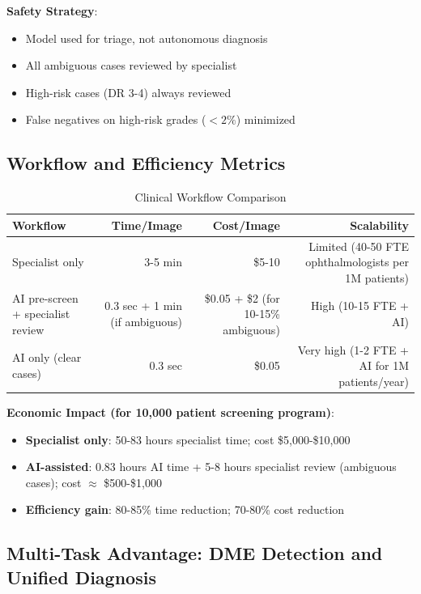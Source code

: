 \documentclass[12pt,a4paper]{article}
\begin{document}
\textbf{Safety Strategy}:

\begin{itemize}
    \item Model used for triage, not autonomous diagnosis
    \item All ambiguous cases reviewed by specialist
    \item High-risk cases (DR 3-4) always reviewed
    \item False negatives on high-risk grades ($< 2\%$) minimized
\end{itemize}

\subsection{Workflow and Efficiency Metrics}

\begin{table}[H]
\centering
\small
\caption{Clinical Workflow Comparison}
\begin{tabular}{|l|r|r|r|}
\hline
\textbf{Workflow} & \textbf{Time/Image} & \textbf{Cost/Image} & \textbf{Scalability} \\
\hline
Specialist only & 3-5 min & \$5-10 & Limited (40-50 FTE ophthalmologists per 1M patients) \\
AI pre-screen + specialist review & 0.3 sec + 1 min (if ambiguous) & \$0.05 + \$2 (for 10-15\% ambiguous) & High (10-15 FTE + AI) \\
AI only (clear cases) & 0.3 sec & \$0.05 & Very high (1-2 FTE + AI for 1M patients/year) \\
\hline
\end{tabular}
\end{table}

\textbf{Economic Impact (for 10,000 patient screening program)}:

\begin{itemize}
    \item \textbf{Specialist only}: 50-83 hours specialist time; cost \$5,000-\$10,000
    \item \textbf{AI-assisted}: 0.83 hours AI time + 5-8 hours specialist review (ambiguous cases); cost $\approx$ \$500-\$1,000
    \item \textbf{Efficiency gain}: 80-85\% time reduction; 70-80\% cost reduction
\end{itemize}

\subsection{Multi-Task Advantage: DME Detection and Unified Diagnosis}
\end{document}
